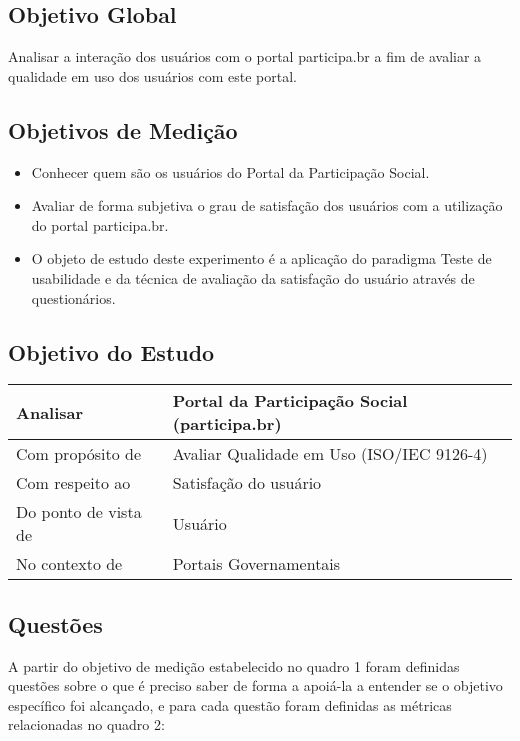 \subsection{Objetivo Global}

	Analisar a interação dos usuários com o portal participa.br a fim de avaliar a qualidade em uso dos usuários com este portal. 

\subsection{Objetivos de Medição}

\begin{itemize}
\item Conhecer quem são os usuários do Portal da Participação Social.
\item Avaliar de forma subjetiva o grau de satisfação dos usuários com a utilização do portal participa.br. 
\item O objeto de estudo deste experimento é a aplicação do paradigma Teste de usabilidade e da técnica de avaliação da satisfação do usuário através de questionários.
\end{itemize}

\subsection{Objetivo do Estudo}


\begin{table}[h]
\begin{tabular}{|l|l|}
\hline
Analisar             & Portal da Participação Social (participa.br) \\ \hline
Com propósito de     & Avaliar Qualidade em Uso (ISO/IEC 9126-4)    \\ \hline
Com respeito ao      & Satisfação do usuário                        \\ \hline
Do ponto de vista de & Usuário                                      \\ \hline
No contexto de       & Portais Governamentais                       \\ \hline
\end{tabular}
\end{table}

\subsection{Questões}

A partir do objetivo de medição estabelecido no quadro 1  foram definidas questões sobre o que é preciso saber de forma a apoiá-la a entender se o objetivo específico foi alcançado, e para cada questão foram definidas as métricas relacionadas no quadro 2: 

